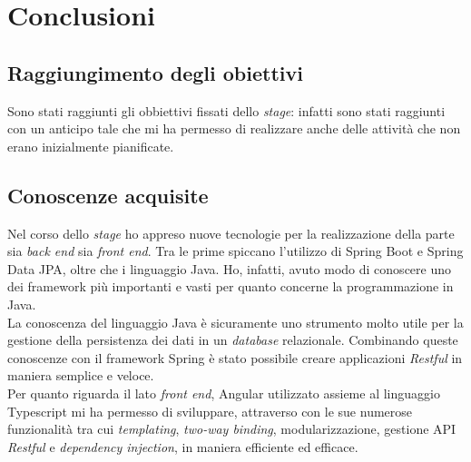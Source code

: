 
\chapter{Conclusioni}
\label{cap:conclusioni}
\section{Raggiungimento degli obiettivi}
Sono stati raggiunti gli obbiettivi fissati dello \textit{stage}: infatti sono stati raggiunti con un anticipo tale che mi ha permesso di realizzare anche delle attività che non erano inizialmente pianificate.




\section{Conoscenze acquisite}
Nel corso dello \textit{stage} ho appreso nuove tecnologie per la realizzazione della parte sia \textit{back end} sia \textit{front end}. Tra le prime spiccano l'utilizzo di Spring Boot e Spring Data JPA, oltre che i linguaggio Java. Ho, infatti, avuto modo di conoscere uno  dei \gls{framework}  più importanti e vasti per quanto concerne la programmazione in Java.\\
La conoscenza del linguaggio Java è sicuramente uno strumento molto utile per la gestione della persistenza dei dati in un \textit{database} relazionale. Combinando queste conoscenze con il \gls{framework} Spring è stato possibile creare applicazioni \textit{Restful} in maniera semplice e veloce.\\
Per quanto riguarda il lato \textit{front end}, Angular utilizzato assieme al linguaggio Typescript mi ha permesso di sviluppare, attraverso con le sue numerose funzionalità tra cui \textit{templating}, \textit{two-way binding}, modularizzazione, gestione \gls{API} \textit{Restful} e \textit{dependency injection}, in maniera efficiente ed efficace.  


